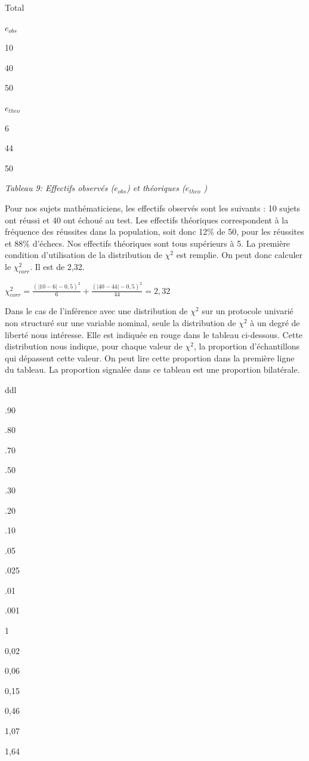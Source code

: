 \documentclass[]{book}
\theoremstyle{definition}
\theoremstyle{definition}
\theoremstyle{definition}
\theoremstyle{remark}
\begin{document}
Total

\(e_{obs}\)

10

40

50

\(e_{theo}\)

6

44

50

\emph{Tableau 9: Effectifs observés (\(e_{obs}\)) et théoriques
(\(e_{theo}\) )}

Pour nos sujets mathématiciens, les effectifs observés sont les suivants
: 10 sujets ont réussi et 40 ont échoué au test. Les effectifs
théoriques correspondent à la fréquence des réussites dans la
population, soit donc 12\% de 50, pour les réussites et 88\% d'échecs.
Nos effectifs théoriques sont tous supérieurs à 5. La première condition
d'utilisation de la distribution de \(\chi^2\) est remplie. On peut donc
calculer le \(\chi^2_{corr}\). Il est de 2,32.

\(\chi_{corr}^{2} = \frac{(\left | 10-6 \right |-0,5)^{2}}{6}+\frac{(\left | 40-44 \right |-0,5)^{2}}{44}=2,32\)

Dans le cas de l'inférence avec une distribution de \(\chi^2\) sur un
protocole univarié non structuré sur une variable nominal, seule la
distribution de \(\chi^2\) à un degré de liberté nous intéresse. Elle
est indiquée en rouge dans le tableau ci-dessous. Cette distribution
nous indique, pour chaque valeur de \(\chi^2\), la proportion
d'échantillons qui dépassent cette valeur. On peut lire cette proportion
dans la première ligne du tableau. La proportion signalée dans ce
tableau est une proportion bilatérale.

ddl

.90

.80

.70

.50

.30

.20

.10

.05

.025

.01

.001

1

0,02

0,06

0,15

0,46

1,07

1,64
\end{document}
